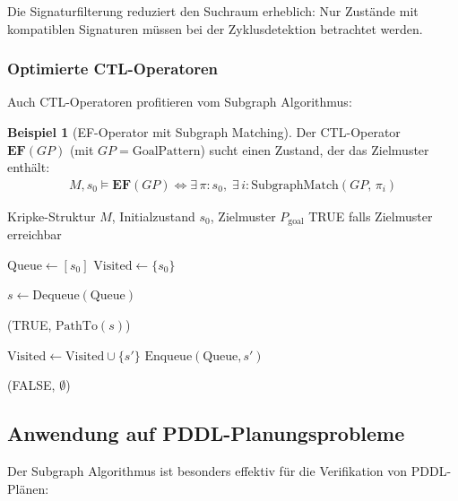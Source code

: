 ﻿\documentclass[a4paper,12pt]{article}
\theoremstyle{definition}
\newtheorem{beispiel}{Beispiel}[section]
\begin{document}
Die Signaturfilterung reduziert den Suchraum erheblich: Nur Zustände mit kompatiblen Signaturen müssen bei der Zyklusdetektion betrachtet werden.

\subsubsection{Optimierte CTL-Operatoren}

Auch CTL-Operatoren profitieren vom Subgraph Algorithmus:

\begin{beispiel}[EF-Operator mit Subgraph Matching]
	Der CTL-Operator $\mathbf{EF}(GP)$ (mit $GP = \text{GoalPattern}$)
	sucht einen Zustand, der das Zielmuster enthält:
	\begin{align}
	M, s_0 \models \mathbf{EF}(GP)
	\iff \exists\, \pi\colon s_0,\;
	      \exists\, i\colon \text{SubgraphMatch}(GP,\, \pi_i)
	\end{align}
\end{beispiel}

\begin{algorithm}[H]
	\caption{Musterbasierter EF-Operator}
	\label{alg:ef_pattern}
	\begin{algorithmic}[1]
		\Eingabe Kripke-Struktur $M$, Initialzustand $s_0$, Zielmuster $P_{\text{goal}}$
		\Ausgabe TRUE falls Zielmuster erreichbar
		
		\State $\text{Queue} \gets [s_0]$
		\State $\text{Visited} \gets \{s_0\}$
		
		\State $s \gets \text{Dequeue}(\text{Queue})$
		
		\State \Return (TRUE, $\text{PathTo}(s)$)
		\EndeWenn
		
		\State $\text{Visited} \gets \text{Visited} \cup \{s'\}$
		\State $\text{Enqueue}(\text{Queue}, s')$
		\EndeWenn
		\EndeFuer
		\EndeWaehrend
		
		\State \Return (FALSE, $\emptyset$)
	\end{algorithmic}
\end{algorithm}

\subsection{Anwendung auf PDDL-Planungsprobleme}

Der Subgraph Algorithmus ist besonders effektiv für die Verifikation von PDDL-Plänen:
\end{document}
